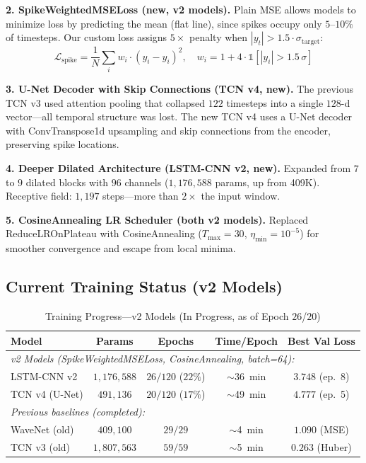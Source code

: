 \documentclass[10pt,journal,compsoc]{IEEEtran}
\begin{document}
\textbf{2. SpikeWeightedMSELoss (new, v2 models).}
Plain MSE allows models to minimize loss by predicting the mean (flat line), since spikes occupy only $5$--$10\%$ of timesteps. Our custom loss assigns $5\times$ penalty when $|y_t| > 1.5 \cdot \sigma_{\text{target}}$:
\begin{equation}
    \mathcal{L}_{\text{spike}} = \frac{1}{N}\sum_{i} w_i \cdot (y_i - \hat{y}_i)^2, \quad w_i = 1 + 4 \cdot \mathbb{1}\!\left[|y_i| > 1.5\,\sigma\right]
\end{equation}

\textbf{3. U-Net Decoder with Skip Connections (TCN v4, new).}
The previous TCN v3 used attention pooling that collapsed $122$ timesteps into a single $128$-d vector---all temporal structure was lost. The new TCN v4 uses a U-Net decoder with ConvTranspose1d upsampling and skip connections from the encoder, preserving spike locations.

\textbf{4. Deeper Dilated Architecture (LSTM-CNN v2, new).}
Expanded from $7$ to $9$ dilated blocks with $96$ channels ($1{,}176{,}588$ params, up from 409K). Receptive field: $1{,}197$ steps---more than $2\times$ the input window.

\textbf{5. CosineAnnealing LR Scheduler (both v2 models).}
Replaced ReduceLROnPlateau with CosineAnnealing ($T_{\text{max}}=30$, $\eta_{\min}=10^{-5}$) for smoother convergence and escape from local minima.

\subsection{Current Training Status (v2 Models)}

\begin{table}[h]
\caption{Training Progress---v2 Models (In Progress, as of Epoch $26$/$20$)}
\label{tab:training_status}
\centering
\begin{tabular}{lcccc}
\toprule
\textbf{Model} & \textbf{Params} & \textbf{Epochs} & \textbf{Time/Epoch} & \textbf{Best Val Loss} \\
\midrule
\multicolumn{5}{l}{\textit{v2 Models (SpikeWeightedMSELoss, CosineAnnealing, batch=64):}} \\
LSTM-CNN v2 & $1{,}176{,}588$ & $26/120$ ($22\%$) & $\sim$36~min & $3.748$ (ep.\ 8) \\
TCN v4 (U-Net) & $491{,}136$ & $20/120$ ($17\%$) & $\sim$49~min & $4.777$ (ep.\ 5) \\
\midrule
\multicolumn{5}{l}{\textit{Previous baselines (completed):}} \\
WaveNet (old) & $409{,}100$ & $29/29$ & $\sim$4~min & $1.090$ (MSE) \\
TCN v3 (old) & $1{,}807{,}563$ & $59/59$ & $\sim$5~min & $0.263$ (Huber) \\
\bottomrule
\end{tabular}
\end{table}
\end{document}
